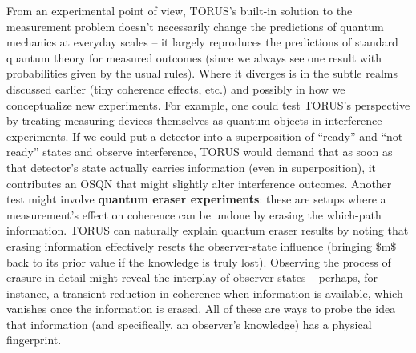 \documentclass[
]{article}
\begin{document}
From an experimental point of view, TORUS's built-in solution to the
measurement problem doesn't necessarily change the predictions of
quantum mechanics at everyday scales -- it largely reproduces the
predictions of standard quantum theory for measured outcomes (since we
always see one result with probabilities given by the usual rules).
Where it diverges is in the subtle realms discussed earlier (tiny
coherence effects, etc.) and possibly in how we conceptualize new
experiments. For example, one could test TORUS's perspective by treating
measuring devices themselves as quantum objects in interference
experiments. If we could put a detector into a superposition of
``ready'' and ``not ready'' states and observe interference, TORUS would
demand that as soon as that detector's state actually carries
information (even in superposition), it contributes an OSQN that might
slightly alter interference outcomes. Another test might involve
\textbf{quantum eraser experiments}: these are setups where a
measurement's effect on coherence can be undone by erasing the
which-path information. TORUS can naturally explain quantum eraser
results by noting that erasing information effectively resets the
observer-state influence (bringing \$m\$ back to its prior value if the
knowledge is truly lost). Observing the process of erasure in detail
might reveal the interplay of observer-states -- perhaps, for instance,
a transient reduction in coherence when information is available, which
vanishes once the information is erased. All of these are ways to probe
the idea that information (and specifically, an observer's knowledge)
has a physical fingerprint.
\end{document}
